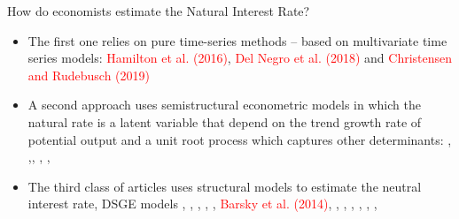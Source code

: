 \documentclass[9pt]{beamer}
\let\olditem\item
\renewcommand{\item}{%
\olditem\vspace{\fill}}
\begin{document}
\begin{frame}{How do economists estimate the Natural Interest Rate?}
\begin{itemize}


\item  The first one relies on pure time-series methods – based on
multivariate time series models: \textcolor{red}{Hamilton et al. (2016)}, \textcolor{red}{Del Negro et al. (2018)} and \textcolor{red}{Christensen and Rudebusch (2019)} 

\item A second approach uses semistructural econometric models in which the natural rate is a latent variable that depend on the trend growth rate of potential output and a unit root process which captures other determinants: \textcolor{red}{\citet{LW:2003}}, \textcolor{red}{\citet{HLW:2017} },\textcolor{red}{\citet{Renne:2007}}, \textcolor{red}{\citet{Wynne:2018}}, \textcolor{red}{\citet{Us:2018}}, \textcolor{red}{\citet{Lewis:2017}}

\item The third class of articles uses structural models to estimate the neutral interest rate, DSGE models \textcolor{red}{\citet{Neiss:2003}},
\textcolor{red}{\citet{Edge:2008}}, \textcolor{red}{\citet{Lopez-Salido:2009}}, \textcolor{red}{\citet{Bjornland:2011}}, \textcolor{red}{\citet{Justiniano:2010} }, \textcolor{red}{Barsky et al. (2014)}, \textcolor{red}{\citet{Canzoneri:2015}}, \textcolor{red}{\citet{Curdia:2015}}, \textcolor{red}{\citet{Hristov:2016}}, \textcolor{red}{\citet{DelNegro:2017}},  \textcolor{red}{\citet{Neri:2018}}, \textcolor{red}{\citet{Grossman:2019}}, \textcolor{red}{\citet{Gali:2019}  }


\end{itemize}
\end{frame}
\end{document}
